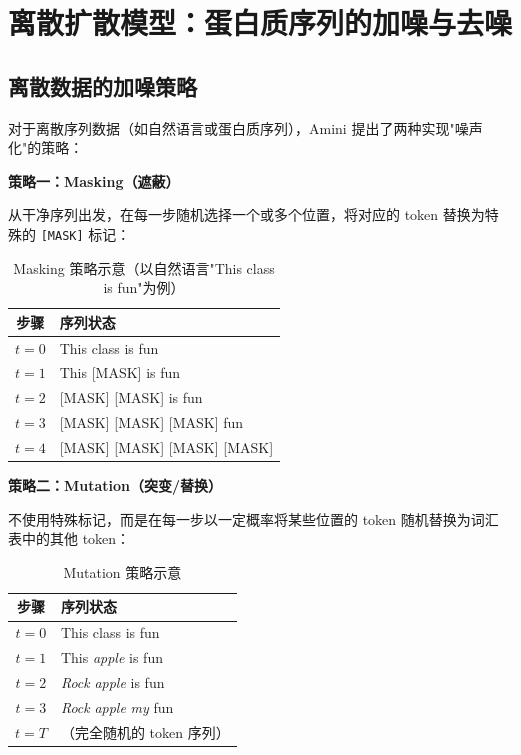 \section{离散扩散模型：蛋白质序列的加噪与去噪}

\subsection{离散数据的加噪策略}

对于离散序列数据（如自然语言或蛋白质序列），Amini 提出了两种实现"噪声化"的策略：

\textbf{策略一：Masking（遮蔽）}

从干净序列出发，在每一步随机选择一个或多个位置，将对应的 token 替换为特殊的 \texttt{[MASK]} 标记：

\begin{table}[H]
\centering
\caption{Masking 策略示意（以自然语言"This class is fun"为例）}
\begin{tabular}{@{}cl@{}}
\toprule
\textbf{步骤} & \textbf{序列状态} \\
\midrule
$t=0$ & This class is fun \\
$t=1$ & This {[}MASK{]} is fun \\
$t=2$ & {[}MASK{]} {[}MASK{]} is fun \\
$t=3$ & {[}MASK{]} {[}MASK{]} {[}MASK{]} fun \\
$t=4$ & {[}MASK{]} {[}MASK{]} {[}MASK{]} {[}MASK{]} \\
\bottomrule
\end{tabular}
\end{table}

\textbf{策略二：Mutation（突变/替换）}

不使用特殊标记，而是在每一步以一定概率将某些位置的 token 随机替换为词汇表中的其他 token：

\begin{table}[H]
\centering
\caption{Mutation 策略示意}
\begin{tabular}{@{}cl@{}}
\toprule
\textbf{步骤} & \textbf{序列状态} \\
\midrule
$t=0$ & This class is fun \\
$t=1$ & This \textit{apple} is fun \\
$t=2$ & \textit{Rock} \textit{apple} is fun \\
$t=3$ & \textit{Rock} \textit{apple} \textit{my} fun \\
$t=T$ & （完全随机的 token 序列） \\
\bottomrule
\end{tabular}
\end{table}

